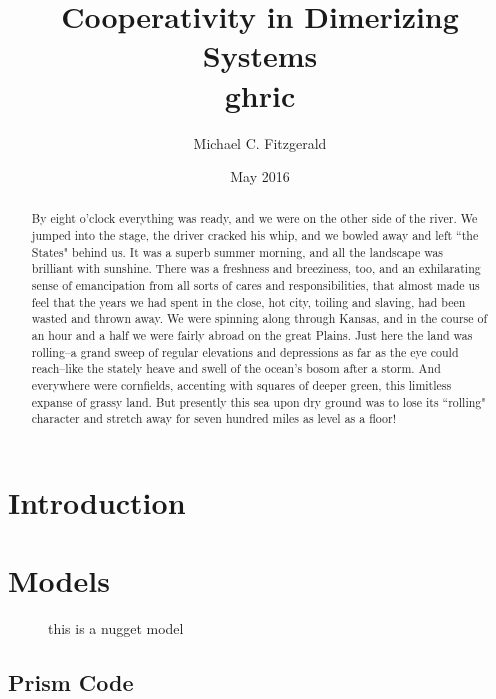 \documentclass[12pt, titlepage]{article}
\begin{document}
\title{\textbf{\huge{Cooperativity in Dimerizing Systems}} \\ ghric}
\author{Michael C. Fitzgerald}
\date{May 2016}
\maketitle

\begin{abstract}
By eight o'clock everything was ready, and we were on the other side of
the river.  We jumped into the stage, the driver cracked his whip, and we
bowled away and left ``the States" behind us.  It was a superb summer
morning, and all the landscape was brilliant with sunshine.  There was a
freshness and breeziness, too, and an exhilarating sense of emancipation
from all sorts of cares and responsibilities, that almost made us feel
that the years we had spent in the close, hot city, toiling and slaving,
had been wasted and thrown away.  We were spinning along through Kansas,
and in the course of an hour and a half we were fairly abroad on the
great Plains.  Just here the land was rolling--a grand sweep of regular
elevations and depressions as far as the eye could reach--like the
stately heave and swell of the ocean's bosom after a storm.  And
everywhere were cornfields, accenting with squares of deeper green, this
limitless expanse of grassy land.  But presently this sea upon dry ground
was to lose its ``rolling" character and stretch away for seven hundred
miles as level as a floor!
\end{abstract}

\newpage
\tableofcontents
\newpage

\section{Introduction}
\blindmathtrue
\blindtext[5]


\section{Models}
\blindtext[5]

\begin{figure}%
\centering

\caption{this is a nugget model}
\end{figure}

\blindtext[5]

\clearpage
\begin{appendices}
\section{Prism Code}
\end{appendices}
\end{document}

